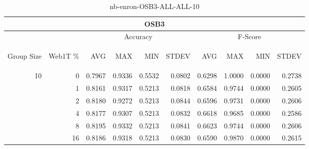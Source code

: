 \begin{center}
\begin{table}[htbp] 
 \begin{center}
\begin{tabular}{ | r | r | r | r | r | r | r | r | r | r |}
\hline
\multicolumn{10}{|c|}{OSB3}\\
\hline
 & & \multicolumn{4}{|c|}{Accuracy} & \multicolumn{4}{|c|}{F-Score}\\ \cline{3-10}
\begin{sideways}Group Size\end{sideways} & \begin{sideways}Web1T \%\end{sideways} & \begin{sideways}AVG\end{sideways} & \begin{sideways}MAX\end{sideways} & \begin{sideways}MIN\end{sideways} & \begin{sideways}STDEV\end{sideways} & \begin{sideways}AVG\end{sideways} & \begin{sideways}MAX\end{sideways} & \begin{sideways}MIN\end{sideways} & \begin{sideways}STDEV\end{sideways}\\
\hline
\multirow{5}{*}{10}
 & 0 & 0.7967 & 0.9336 & 0.5532 & 0.0802 & 0.6298 & 1.0000 & 0.0000 & 0.2738\\ \cline{2-10}
 & 1 & 0.8161 & 0.9317 & 0.5213 & 0.0818 & 0.6584 & 0.9744 & 0.0000 & 0.2605\\ \cline{2-10}
 & 2 & 0.8180 & 0.9272 & 0.5213 & 0.0844 & 0.6596 & 0.9731 & 0.0000 & 0.2606\\ \cline{2-10}
 & 4 & 0.8177 & 0.9307 & 0.5213 & 0.0832 & 0.6618 & 0.9685 & 0.0000 & 0.2586\\ \cline{2-10}
 & 8 & 0.8195 & 0.9332 & 0.5213 & 0.0841 & 0.6623 & 0.9744 & 0.0000 & 0.2606\\ \cline{2-10}
 & 16 & 0.8186 & 0.9318 & 0.5213 & 0.0830 & 0.6590 & 0.9870 & 0.0000 & 0.2615\\ \cline{2-10}
\hline
\end{tabular}
\caption{nb-enron-OSB3-ALL-ALL-10}
\label{table:nb-enron-OSB3-ALL-ALL-10}
\end{center}
 \end{table}
\end{center}

